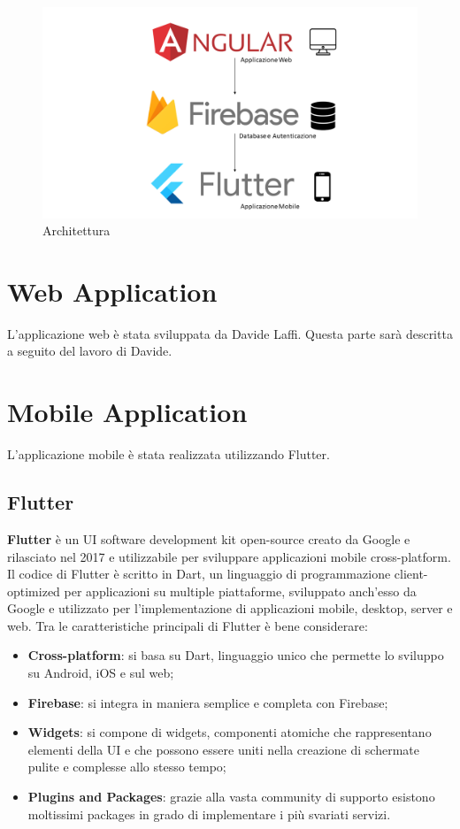 \documentclass[12pt,a4paper,twoside,openright,titlepage]{book}
\begin{document}
\begin{figure}[H]
\centering
\includegraphics[scale = 0.4]{architecture}
\caption{Architettura}
\end{figure}

\section{Web Application}
L'applicazione web è stata sviluppata da Davide Laffi. Questa parte sarà descritta a seguito del lavoro di Davide.

\section{Mobile Application}
L'applicazione mobile è stata realizzata utilizzando Flutter.

\subsection{Flutter}
\textbf{Flutter} è un UI software development kit open-source creato da Google e rilasciato nel 2017 e utilizzabile per sviluppare applicazioni mobile cross-platform. Il codice di Flutter è scritto in Dart, un linguaggio di programmazione client-optimized per applicazioni su multiple piattaforme, sviluppato anch'esso da Google e utilizzato per l'implementazione di applicazioni mobile, desktop, server e web. Tra le caratteristiche principali di Flutter è bene considerare:
\begin{itemize}
\item \textbf{Cross-platform}: si basa su Dart, linguaggio unico che permette lo sviluppo su Android, iOS e sul web;
\item \textbf{Firebase}: si integra in maniera semplice e completa con Firebase;
\item \textbf{Widgets}: si compone di widgets, componenti atomiche che rappresentano elementi della UI e che possono essere uniti nella creazione di schermate pulite e complesse allo stesso tempo; 
\item \textbf{Plugins and Packages}: grazie alla vasta community di supporto esistono moltissimi packages in grado di implementare i più svariati servizi.
\end{itemize}
\end{document}
